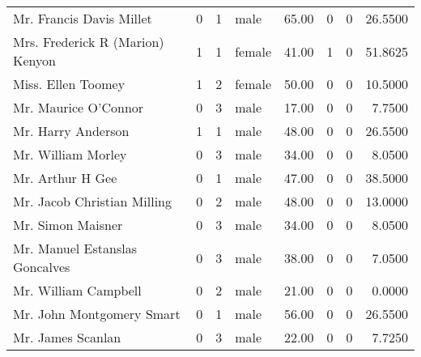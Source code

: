 \begin{tabular}{lrrlrrrr}
Mr. Francis Davis Millet                           &         0 &       1 &    male &  65.00 &                        0 &                        0 &   26.5500 \\
Mrs. Frederick R (Marion) Kenyon                   &         1 &       1 &  female &  41.00 &                        1 &                        0 &   51.8625 \\
Miss. Ellen Toomey                                 &         1 &       2 &  female &  50.00 &                        0 &                        0 &   10.5000 \\
Mr. Maurice O'Connor                               &         0 &       3 &    male &  17.00 &                        0 &                        0 &    7.7500 \\
Mr. Harry Anderson                                 &         1 &       1 &    male &  48.00 &                        0 &                        0 &   26.5500 \\
Mr. William Morley                                 &         0 &       3 &    male &  34.00 &                        0 &                        0 &    8.0500 \\
Mr. Arthur H Gee                                   &         0 &       1 &    male &  47.00 &                        0 &                        0 &   38.5000 \\
Mr. Jacob Christian Milling                        &         0 &       2 &    male &  48.00 &                        0 &                        0 &   13.0000 \\
Mr. Simon Maisner                                  &         0 &       3 &    male &  34.00 &                        0 &                        0 &    8.0500 \\
Mr. Manuel Estanslas Goncalves                     &         0 &       3 &    male &  38.00 &                        0 &                        0 &    7.0500 \\
Mr. William Campbell                               &         0 &       2 &    male &  21.00 &                        0 &                        0 &    0.0000 \\
Mr. John Montgomery Smart                          &         0 &       1 &    male &  56.00 &                        0 &                        0 &   26.5500 \\
Mr. James Scanlan                                  &         0 &       3 &    male &  22.00 &                        0 &                        0 &    7.7250 \\

\end{tabular}
